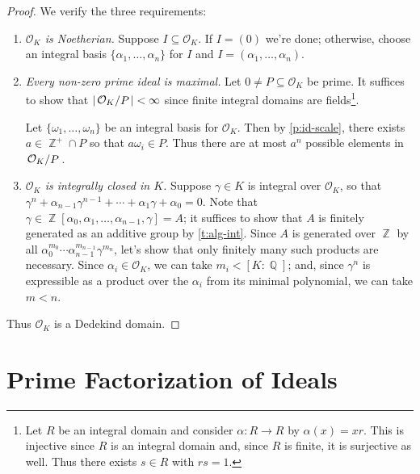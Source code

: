 \documentclass[11pt, a4paper]{memoir}
\DeclareMathOperator{\Q}{{\mathbb{Q}}}
\DeclareMathOperator{\Z}{{\mathbb{Z}}}
\newcommand{\abs}[1]{\ensuremath{\left\lvert#1\right\rvert}}
\theoremstyle{change}
\theoremstyle{plain}
\theoremstyle{nonumberplain}
\newtheorem{proof}{Proof}
\newcommand{\quot}[2]{\mathchoice{\left.\raisebox{0.07em}{$#1$}\middle/\raisebox{-0.07em}{$#2$}\right.}
                                 {\left.\raisebox{0.03em}{$#1$}\middle/\raisebox{-0.03em}{$#2$}\right.}
                                 {\left.\raisebox{0.00em}{$#1$}\middle/\raisebox{-0.00em}{$#2$}\right.}
                                 {\left.\raisebox{0em}{$#1$}\middle/\raisebox{0em}{$#2$}\right.}}
\numberwithin{equation}{section}
\begin{document}
\begin{proof}
    We verify the three requirements:
    \begin{enumerate}
        \item \textit{$\mathcal{O}_K$ is Noetherian.}
            Suppose $I\subseteq\mathcal{O}_K$.
            If $I=(0)$ we're done; otherwise, choose an integral basis $\{\alpha_1,\ldots,\alpha_n\}$ for $I$ and $I=(\alpha_1,\ldots,\alpha_n)$.
        \item \textit{Every non-zero prime ideal is maximal.}
            Let $0\neq P\subseteq\mathcal{O}_K$ be prime.
            It suffices to show that $\abs{\quot{\mathcal{O}_K}{P}}<\infty$ since finite integral domains are fields\footnote{Let $R$ be an integral domain and consider $\alpha:R\to R$ by $\alpha(x)=xr$.
                This is injective since $R$ is an integral domain and, since $R$ is finite, it is surjective as well.
            Thus there exists $s\in R$ with $rs=1$.}.

            Let $\{\omega_1,\ldots,\omega_n\}$ be an integral basis for $\mathcal{O}_K$.
            Then by \cref{p:id-scale}, there exists $a\in\Z^+\cap P$ so that $a\omega_i\in P$.
            Thus there are at most $a^n$ possible elements in $\quot{\mathcal{O}_K}{P}$.
        \item \textit{$\mathcal{O}_K$ is integrally closed in $K$.}
            Suppose $\gamma\in K$ is integral over $\mathcal{O}_K$, so that $\gamma^n+\alpha_{n-1}\gamma^{n-1}+\cdots+\alpha_1\gamma+\alpha_0=0$.
            Note that $\gamma\in\Z[\alpha_0,\alpha_1,\ldots,\alpha_{n-1},\gamma]=A$; it suffices to show that $A$ is finitely generated as an additive group by \cref{t:alg-int}.
            Since $A$ is generated over $\Z$ by all $\alpha_0^{m_0}\cdots\alpha_{n-1}^{m_{n-1}}\gamma^{m_n}$, let's show that only finitely many such products are necessary.
            Since $\alpha_i\in\mathcal{O}_K$, we can take $m_i<[K:\Q]$; and, since $\gamma^n$ is expressible as a product over the $\alpha_i$ from its minimal polynomial, we can take $m<n$.
    \end{enumerate}
    Thus $\mathcal{O}_K$ is a Dedekind domain.
\end{proof}
\section{Prime Factorization of Ideals}
\end{document}

